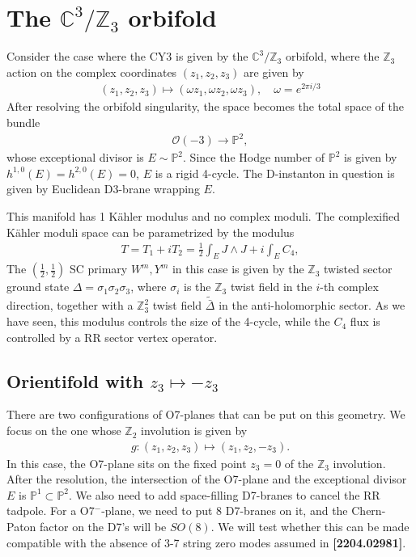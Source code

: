 \documentclass[12pt]{article}
\newcommand{\ie}{\begin{equation}\begin{aligned}}
\newcommand{\fe}{\end{aligned}\end{equation}}
\begin{document}
\section{The $\mathbb{C}^3/\mathbb{Z}_3$ orbifold}

Consider the case where the CY3 is given by the $\mathbb{C}^3/\mathbb{Z}_3$ orbifold, where the $\mathbb{Z}_3$ action on the complex coordinates $(z_1, z_2, z_3)$ are given by
\ie
(z_1, z_2, z_3) \mapsto (\omega z_1,\omega z_2,\omega z_3),\quad \omega = e^{2\pi i/3}
\fe
After resolving the orbifold singularity, the space becomes the total space of the bundle
\ie
\mathcal{O}(-3)\rightarrow \mathbb{P}^2,
\fe
whose exceptional divisor is $E \sim \mathbb{P}^2$. Since the Hodge number of $\mathbb{P}^2$ is given by $h^{1,0}(E)=h^{2,0}(E)=0$, $E$ is a rigid 4-cycle. The D-instanton in question is given by Euclidean D3-brane wrapping $E$. 

This manifold has 1 K\"ahler modulus and no complex moduli. The complexified K\"ahler moduli space can be parametrized by the modulus
\ie
T = T_1+iT_2=\frac{1}{2}\int_{E} J \wedge J +i \int_E C_4,
\fe
The $(\frac{1}{2}, \frac{1}{2})$ SC primary $W^m, Y^m$ in this case is given by the $\mathbb{Z}_3$ twisted sector ground state $\Delta = \sigma_1\sigma_2\sigma_3$, where $\sigma_i$ is the $\mathbb{Z}_3$ twist field in the $i$-th complex direction, together with a $\mathbb{Z}_3^2$ twist field $\tilde{\bar{\Delta}}$ in the anti-holomorphic sector. As we have seen, this modulus controls the size of the 4-cycle, while the $C_4$ flux is controlled by a RR sector vertex operator.

\subsection{Orientifold with $z_3\mapsto -z_3$}

There are two configurations of O7-planes that can be put on this geometry. We focus on the one whose $\mathbb{Z}_2$ involution is given by
\ie
g: (z_1, z_2, z_3) \mapsto (z_1, z_2, -z_3).
\fe
In this case, the O7-plane sits on the fixed point $z_3=0$ of the $\mathbb{Z}_3$ involution. After the resolution, the intersection of the O7-plane and the exceptional divisor $E$ is $\mathbb{P}^1 \subset \mathbb{P}^2$. We also need to add space-filling D7-branes to cancel the RR tadpole. For a O7${}^-$-plane, we need to put 8 D7-branes on it, and the Chern-Paton factor on the D7's will be $SO(8)$. We will test whether this can be made compatible with the absence of 3-7 string zero modes assumed in \textbf{[2204.02981]}.
\end{document}
